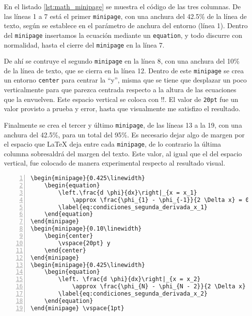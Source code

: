 En el listado \ref{lst:math_minipage} se muestra el código de las tres columnas. De las líneas 1 a 7 está el primer \texttt{minipage}, con una anchura del 42.5\% de la línea de texto, según se establece en el parámetro de anchura del entorno (línea 1). Dentro del \texttt{minipage} insertamos la ecuación mediante un \texttt{equation}, y todo discurre con normalidad, hasta el cierre del \texttt{minipage} en la línea 7.

De ahí se contruye el segundo \texttt{minipage} en la línea 8, con una anchura del 10\% de la línea de texto, que se cierra en la línea 12. Dentro de este \texttt{minipage} se crea un entorno \texttt{center} para centrar la ``y'', misma que se tiene que desplazar un poco verticalmente para que parezca centrada respecto a la altura de las ecuaciones que la envuelven. Este espacio vertical se coloca con !\vspace{unidad de medida}!. El valor de \texttt{20pt} fue un valor provisto a prueba y error, hasta que visualmente me satisfizo el resultado.

Finalmente se crea el tercer y último \texttt{minipage}, de las líneas 13 a la 19, con una anchura del 42.5\%, para un total del 95\%. Es necesario dejar algo de margen por el espacio que \LaTeX{} deja entre cada \texttt{minipage}, de lo contrario la última columna sobresaldrá del margen del texto. Este valor, al igual que el del espacio vertical, fue colocado de manera experimental respecto al resultado visual.

\begin{lstlisting}[style=latex,numbers=left,caption={Uso de \texttt{minipage} para ecuaciones lado a lado.},label=lst:math_minipage]
\begin{minipage}{0.425\linewidth}
	\begin{equation}
		\left.\frac{d \phi}{dx}\right|_{x = x_1}
			\approx \frac{\phi_{1} - \phi_{-1}}{2 \Delta x} = 0
		\label{eq:condiciones_segunda_derivada_x_1}
	\end{equation}
\end{minipage}
\begin{minipage}{0.10\linewidth}
	\begin{center}
		\vspace{20pt} y
	\end{center}
\end{minipage}
\begin{minipage}{0.425\linewidth}
	\begin{equation}
		\left. \frac{d \phi}{dx}\right|_{x = x_2}
			\approx \frac{\phi_{N} - \phi_{N - 2}}{2 \Delta x} = 0
		\label{eq:condiciones_segunda_derivada_x_2}
	\end{equation}
\end{minipage} \vspace{1pt}
\end{lstlisting}



